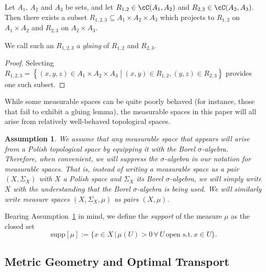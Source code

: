 \documentclass[twoside,11pt]{article}
\newtheorem{assumption}[theorem]{Assumption}
\newcommand{\set}[2]{\left\{ #1\middle| #2\right\}}
\newcommand{\supp}{\mathrm{supp}}
\begin{document}
\begin{proposition}\label{lem:gluing-correspondences}
    Let $A_1$, $A_2$ and $A_3$ be sets, and let $R_{1,2} \in \cC(A_1, A_2)$ and $R_{2,3} \in \cC(A_2, A_3)$. Then there exists a subset $R_{1,2,3}\subseteq A_1\times A_2 \times A_3$ which projects to $R_{1,2}$ on $A_1\times A_2$ and $R_{2,3}$ on $A_2\times A_3$.
\end{proposition}
We call such an $R_{1,2,3}$ a \emph{gluing} of $R_{1,2}$ and $R_{2,3}$.

\begin{proof}
    Selecting $R_{1,2,3} = \set{(x,y,z) \in A_1{\times}A_2{\times}A_3}{(x,y)\in R_{1,2}, (y,z)\in R_{2,3}}$ provides one such subset.
\end{proof}

While some measurable spaces can be quite poorly behaved (for instance, those that fail to exhibit a gluing lemma), the measurable spaces in this paper will all arise from relatively well-behaved topological spaces.

\begin{assumption}\label{assume:polish} We assume that any measurable space that appears will arise from a Polish topological space by equipping it with the Borel $\sigma$-algebra. Therefore, when convenient, we will suppress the $\sigma$-algebra in our notation for measurable spaces. That is, instead of writing a measurable space as a pair $(X,\Sigma_X)$ with $X$ a Polish space and $\Sigma_X$ its Borel $\sigma$-algebra, we will simply write $X$ with the understanding that the Borel $\sigma$-algebra is being used. We will similarly write measure spaces $(X, \Sigma_X, \mu)$ as pairs $(X,\mu)$.
    
\end{assumption}




Bearing Assumption~\ref{assume:polish} in mind, we define the \emph{support} of the measure $\mu$ as the closed set $$\supp[\mu]:=\{x\in X\,|\,\mu(U)>0\,\forall\,U\,\mbox{open s.t.}\, x\in U\}.$$

\subsection{Metric Geometry and Optimal Transport}\label{subsec:MG-and-OT}
\end{document}
